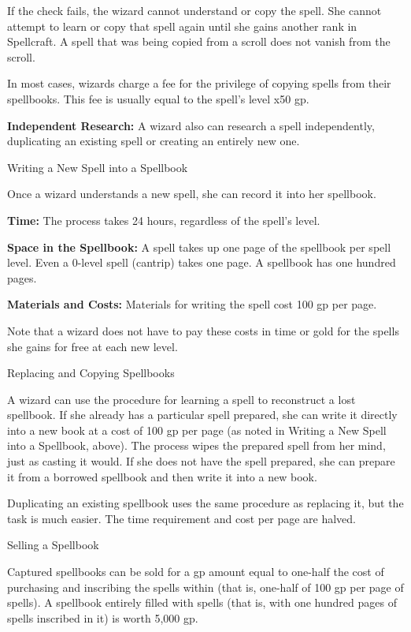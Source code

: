 \documentclass{article}
\begin{document}
If the check fails, the wizard cannot understand or copy the spell. She cannot 
attempt to learn or copy that spell again until she gains another rank in Spellcraft. 
A spell that was being copied from a scroll does not vanish from the scroll.

In most cases, wizards charge a fee for the privilege of copying spells from their 
spellbooks. This fee is usually equal to the spell's level x$ $50 gp.

\textbf{Independent Research:} A wizard also can research a spell independently, 
duplicating an existing spell or creating an entirely new one.

\vspace{12pt}
Writing a New Spell into a Spellbook

Once a wizard understands a new spell, she can record it into her spellbook.

\textbf{Time:} The process takes 24 hours, regardless of the spell's level.

\textbf{Space in the Spellbook:} A spell takes up one page of the spellbook per 
spell level. Even a 0-level spell (cantrip) takes one page. A spellbook has one 
hundred pages.

\textbf{Materials and Costs:} Materials for writing the spell cost 100 gp per page.

Note that a wizard does not have to pay these costs in time or gold for the spells 
she gains for free at each new level. 

\vspace{12pt}
Replacing and Copying Spellbooks

A wizard can use the procedure for learning a spell to reconstruct a lost spellbook. 
If she already has a particular spell prepared, she can write it directly into 
a new book at a cost of 100 gp per page (as noted in Writing a New Spell into a 
Spellbook, above). The process wipes the prepared spell from her mind, just as 
casting it would. If she does not have the spell prepared, she can prepare it from 
a borrowed spellbook and then write it into a new book.

Duplicating an existing spellbook uses the same procedure as replacing it, but 
the task is much easier. The time requirement and cost per page are halved.

\vspace{12pt}
Selling a Spellbook

Captured spellbooks can be sold for a gp amount equal to one-half the cost of purchasing 
and inscribing the spells within (that is, one-half of 100 gp per page of spells). 
A spellbook entirely filled with spells (that is, with one hundred pages of spells 
inscribed in it) is worth 5,000 gp.
\end{document}
